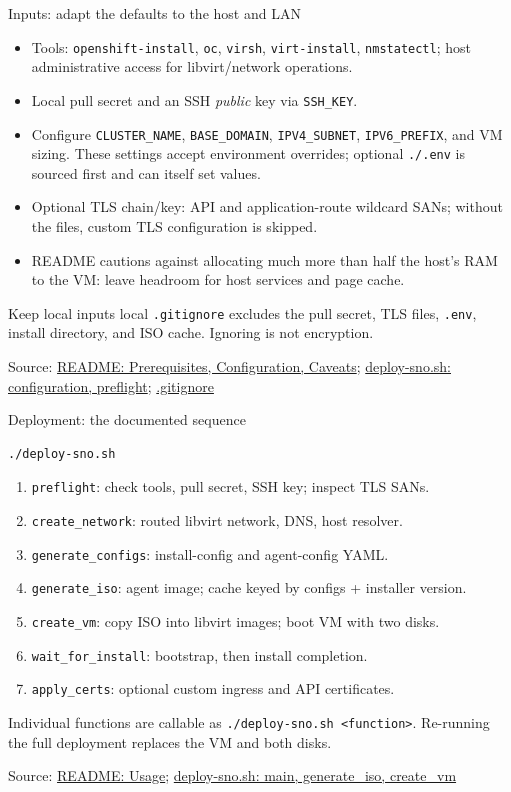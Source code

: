 \documentclass[aspectratio=169,11pt]{beamer}
\newcommand{\reposource}[1]{\par\vfill{\tiny Source: #1\par}}
\newcommand{\readmeref}[1]{\href{https://github.com/matejvasek/mycluster/blob/master/README.md}{README: #1}}
\newcommand{\scriptref}[1]{\href{https://github.com/matejvasek/mycluster/blob/master/deploy-sno.sh}{deploy-sno.sh: #1}}
\begin{document}
\begin{frame}{Inputs: adapt the defaults to the host and LAN}
  \begin{itemize}
    \item Tools: \texttt{openshift-install}, \texttt{oc}, \texttt{virsh},
      \texttt{virt-install}, \texttt{nmstatectl}; host administrative access
      for libvirt/network operations.
    \item Local pull secret and an SSH \emph{public} key via \texttt{SSH\_KEY}.
    \item Configure \texttt{CLUSTER\_NAME}, \texttt{BASE\_DOMAIN},
      \texttt{IPV4\_SUBNET}, \texttt{IPV6\_PREFIX}, and VM sizing.
      These settings accept environment overrides; optional \texttt{./.env}
      is sourced first and can itself set values.
    \item Optional TLS chain/key: API and application-route wildcard SANs;
      without the files, custom TLS configuration is skipped.
    \item README cautions against allocating much more than half the host's
      RAM to the VM: leave headroom for host services and page cache.
  \end{itemize}
  \begin{block}{Keep local inputs local}
    \small \texttt{.gitignore} excludes the pull secret, TLS files,
    \texttt{.env}, install directory, and ISO cache. Ignoring is not encryption.
  \end{block}
  \reposource{\readmeref{Prerequisites, Configuration, Caveats}; \scriptref{configuration, preflight};
    \href{https://github.com/matejvasek/mycluster/blob/master/.gitignore}{.gitignore}}
\end{frame}

\begin{frame}[fragile]{Deployment: the documented sequence}
\begin{verbatim}
./deploy-sno.sh
\end{verbatim}
  \begin{enumerate}
    \item \texttt{preflight}: check tools, pull secret, SSH key; inspect TLS SANs.
    \item \texttt{create\_network}: routed libvirt network, DNS, host resolver.
    \item \texttt{generate\_configs}: install-config and agent-config YAML.
    \item \texttt{generate\_iso}: agent image; cache keyed by configs + installer version.
    \item \texttt{create\_vm}: copy ISO into libvirt images; boot VM with two disks.
    \item \texttt{wait\_for\_install}: bootstrap, then install completion.
    \item \texttt{apply\_certs}: optional custom ingress and API certificates.
  \end{enumerate}
  \small Individual functions are callable as \texttt{./deploy-sno.sh <function>}.
  \alert{Re-running the full deployment replaces the VM and both disks.}
  \reposource{\readmeref{Usage}; \scriptref{main, generate\_iso, create\_vm}}
\end{frame}
\end{document}
